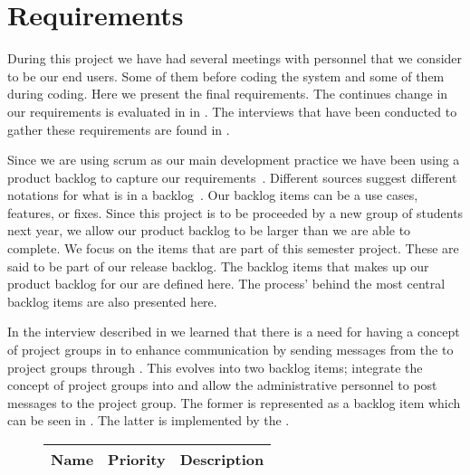 \section{Requirements}
\label{sec:requirements}
During this project we have had several meetings with personnel that we consider to be our end users.
Some of them before coding the system and some of them during coding.
Here we present the final requirements.
The continues change in our requirements is evaluated in  in .
The interviews that have been conducted to gather these requirements are found in .

Since we are using scrum as our main development practice we have been using a product backlog to capture our requirements~\cite[p.~114]{Larman04}.
Different sources suggest different notations for what is in a backlog~\cite[p.~17]{scrumchecklist}\cite[pp.~123-124]{Larman04}.
Our backlog items can be a use cases, features, or fixes.
Since this project is to be proceeded by a new group of students next year, we allow our product backlog to be larger than we are able to complete.
We focus on the items that are part of this semester project.
These are said to be part of our release backlog.
The backlog items that makes up our product backlog for our \subsystem{} are defined here.
The process' behind the most central backlog items are also presented here.

In the interview described in  we learned that there is a need for having a concept of project groups in \moodle{} to enhance communication by sending messages from the \admpers{} to project groups through \moodle{}.
This evolves into two backlog items; integrate the concept of project groups into \moodle{} and allow the administrative personnel to post messages to the project group.
The former is represented as a backlog item which can be seen in \figref{}.
The latter is implemented by the \supervisorgroup{}.

\begin{figure}%
\begin{tabular}{|p{}|p{}|p{}|}
	\hline
	\textbf{Name} & \textbf{Priority} & \textbf{Description} \\
	\hline
	
\end{tabular}
\label{fig:productbacklog}
\end{figure}
